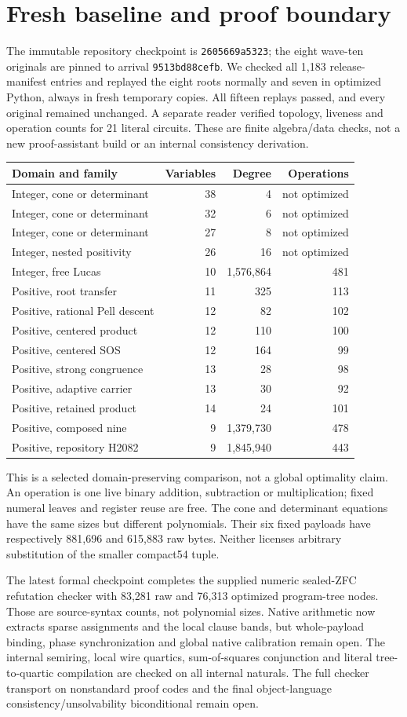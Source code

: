 \section{Fresh baseline and proof boundary}
The immutable repository checkpoint is \texttt{2605669a5323}; the eight
wave-ten originals are pinned to arrival \texttt{9513bd88cefb}. We checked
all 1,183 release-manifest entries and replayed the eight roots normally and
seven in optimized Python, always in fresh temporary copies. All fifteen
replays passed, and every original remained unchanged. A separate reader
verified topology, liveness and operation counts for 21 literal circuits.
These are finite algebra/data checks, not a new proof-assistant build or an
internal consistency derivation.

\begin{center}
\begin{tabular}{lrrr}
Domain and family&Variables&Degree&Operations\\\hline
Integer, cone or determinant&38&4&not optimized\\
Integer, cone or determinant&32&6&not optimized\\
Integer, cone or determinant&27&8&not optimized\\
Integer, nested positivity&26&16&not optimized\\
Integer, free Lucas&10&1,576,864&481\\
Positive, root transfer&11&325&113\\
Positive, rational Pell descent&12&82&102\\
Positive, centered product&12&110&100\\
Positive, centered SOS&12&164&99\\
Positive, strong congruence&13&28&98\\
Positive, adaptive carrier&13&30&92\\
Positive, retained product&14&24&101\\
Positive, composed nine&9&1,379,730&478\\
Positive, repository H2082&9&1,845,940&443
\end{tabular}
\end{center}
This is a selected domain-preserving comparison, not a global optimality
claim. An operation is one live binary addition, subtraction or
multiplication; fixed numeral leaves and register reuse are free.
The cone and determinant equations have the same sizes but different
polynomials. Their six fixed payloads have respectively 881,696 and
615,883 raw bytes. Neither licenses arbitrary substitution of the smaller
compact54 tuple.

The latest formal checkpoint completes the supplied numeric sealed-ZFC
refutation checker with 83,281 raw and 76,313 optimized program-tree nodes.
Those are source-syntax counts, not polynomial sizes. Native arithmetic now
extracts sparse assignments and the local clause bands, but whole-payload
binding, phase synchronization and global native calibration remain open.
The internal semiring, local wire quartics, sum-of-squares conjunction and
literal tree-to-quartic compilation are checked on all internal naturals.
The full checker transport on nonstandard proof codes and the final
object-language consistency/unsolvability biconditional remain open.

